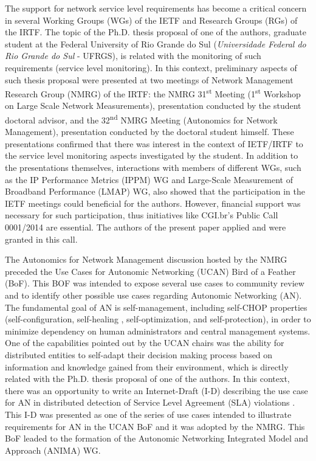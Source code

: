 \documentclass[12pt]{article}
\begin{document}

The support for network service level requirements has become a critical concern in several Working Groups (WGs) of the IETF and Research Groups (RGs) of the IRTF. The topic of the Ph.D. thesis proposal of one of the authors, graduate student at the Federal University of Rio Grande do Sul (\textit{Universidade Federal do Rio Grande do Sul} - UFRGS), is related with the monitoring of such requirements (service level monitoring). In this context, preliminary aspects of such thesis proposal were presented at two meetings of Network Management Research Group (NMRG) of the IRTF: the NMRG 31\textsuperscript{st} Meeting (1\textsuperscript{st} Workshop on Large Scale Network Measurements), presentation conducted by the student doctoral advisor, and the 32\textsuperscript{nd} NMRG Meeting (Autonomics for Network Management), presentation conducted by the doctoral student himself. These presentations confirmed that there was interest in the context of IETF/IRTF to the service level monitoring aspects investigated by the student. In addition to the presentations themselves, interactions with members of different WGs, such as the IP Performance Metrics (IPPM) WG and Large-Scale Measurement of Broadband Performance (LMAP) WG, also showed that the participation in the IETF meetings could beneficial for the authors. However, financial support was necessary for such participation, thus initiatives like CGI.br's Public Call 0001/2014 are essential. The authors of the present paper applied and were granted in this call.


The Autonomics for Network Management discussion hosted by the NMRG preceded the Use Cases for Autonomic Networking (UCAN) Bird of a Feather (BoF). This BOF was intended to expose several use cases to community review and to identify other possible use cases regarding Autonomic Networking (AN). The fundamental goal of AN is self-management, including self-CHOP properties (self-configuration, self-healing , self-optimization, and self-protection), in order to minimize dependency on human administrators and central management systems. One of the capabilities pointed out by the UCAN chairs was the ability for distributed entities to self-adapt their decision making process based on information and knowledge gained from their environment, which is directly related with the Ph.D. thesis proposal of one of the authors. In this context, there was an opportunity to write an Internet-Draft (I-D) describing the use case for AN in distributed detection of Service Level Agreement (SLA) violations \cite{NMRG-Nobre-2015}. This I-D was presented as one of the series of use cases intended to illustrate requirements for AN in the UCAN BoF and it was adopted by the NMRG. This BoF leaded to the formation of the Autonomic Networking Integrated Model and Approach (ANIMA) WG.
\end{document}
